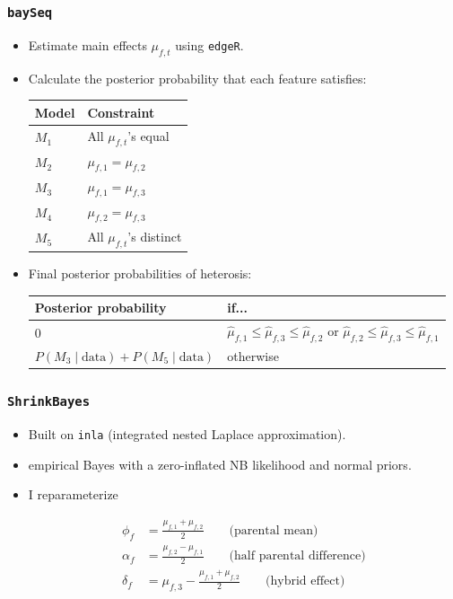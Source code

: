 \documentclass[handout]{beamer}
\providecommand{\wh}[1]{\widehat{#1}}
\numberwithin{equation}{section}
\begin{document}
\begin{frame}
\frametitle{{\tt baySeq}}
\begin{itemize}
\item Estimate main effects $\mu_{f, t}$ using {\tt edgeR}.
\pause \item Calculate the posterior probability that each feature satisfies:

\begin{center}
\begin{tabular}{l|l}
Model & Constraint \\ \hline
$M_1$ & All $\mu_{f, t}$'s equal \\
$M_2$ &  $\mu_{f, 1} = \mu_{f, 2}$ \\
$M_3$ & $\mu_{f, 1} = \mu_{f, 3}$ \\
$M_4$ & $\mu_{f, 2} = \mu_{f, 3}$ \\
$M_5$ &  All $\mu_{f, t}$'s distinct
\end{tabular}
\end{center}

\pause \item Final posterior probabilities of heterosis:
\begin{center}
\begin{tabular}{l|p{4cm}}
Posterior probability & if... \\ \hline
0 & $\wh{\mu}_{f, 1} \le \wh{\mu}_{f, 3} \le \wh{\mu}_{f, 2}$ or $\wh{\mu}_{f, 2} \le \wh{\mu}_{f, 3} \le \wh{\mu}_{f, 1}$ \\
$P(M_3 \mid \text{data}) + P(M_5 \mid \text{data})$ & otherwise
\end{tabular}
\end{center}

\end{itemize}
\end{frame}


\begin{frame}
\frametitle{{\tt ShrinkBayes}}
\begin{itemize}
\item Built on {\tt inla} (integrated nested Laplace approximation).
\pause \item empirical Bayes with a zero-inflated NB likelihood and normal priors.
\pause \item I reparameterize

\begin{align*}
\phi_f &= \frac{\mu_{f, 1} + \mu_{f, 2}}{2} \qquad \text{(parental mean)} \\
\alpha_f &= \frac{\mu_{f, 2} - \mu_{f, 1}}{2} \qquad \text{(half parental difference)} \\
\delta_f &= \mu_{f, 3} - \frac{\mu_{f, 1} + \mu_{f, 2}}{2} \qquad \text{(hybrid effect)} 
\end{align*}
\end{itemize}
\end{frame}
\end{document}
